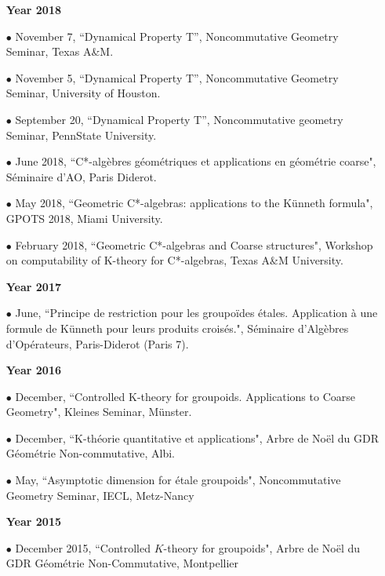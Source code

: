 \documentclass[a4paper,11pt]{article}
\newcommand\espace{\vrule height 20pt width 0pt}
\begin{document}
\begin{itemize}
\item[\textbf{Year 2018}]
\item[$\bullet$] November 7, ``Dynamical Property T'', Noncommutative Geometry Seminar, Texas A\&M.
\item[$\bullet$] November 5, ``Dynamical Property T'', Noncommutative Geometry Seminar, University of Houston.
\item[$\bullet$] September 20, ``Dynamical Property T'', Noncommutative geometry Seminar, PennState University.
\item[$\bullet$] June 2018, ``C*-alg\`ebres g\'eom\'etriques et applications en g\'eom\'etrie coarse", S\'eminaire d'AO, Paris Diderot.
\item[$\bullet$] May 2018, ``Geometric C*-algebras: applications to the K\"unneth formula", GPOTS 2018, Miami University.
\item[$\bullet$] February 2018, ``Geometric C*-algebras and Coarse structures", Workshop on computability of K-theory for C*-algebras, Texas A\&M University.
\end{itemize}

\begin{itemize}
\item[\textbf{Year 2017}]
\item[$\bullet$] June, ``Principe de restriction pour les groupoïdes étales. Application à une formule de Künneth pour leurs produits croisés.", Séminaire d'Algèbres d'Opérateurs, Paris-Diderot (Paris 7).
\end{itemize}
\newpage
\begin{itemize}
\item[\textbf{Year 2016}]
\item[$\bullet$] December, ``Controlled K-theory for groupoids. Applications to Coarse Geometry", Kleines Seminar, Münster.
\item[$\bullet$] December, ``K-théorie quantitative et applications", Arbre de Noël du GDR Géométrie Non-commutative, Albi.
\item[$\bullet$] May, ``Asymptotic dimension for étale groupoids", Noncommutative Geometry Seminar, IECL, Metz-Nancy
\end{itemize}

\begin{itemize}
\item[\textbf{Year 2015}]
\item[$\bullet$] December 2015, ``Controlled $K$-theory for groupoids", Arbre de Noël du GDR Géométrie Non-Commutative, Montpellier
\end{itemize}
\espace
\end{document}
